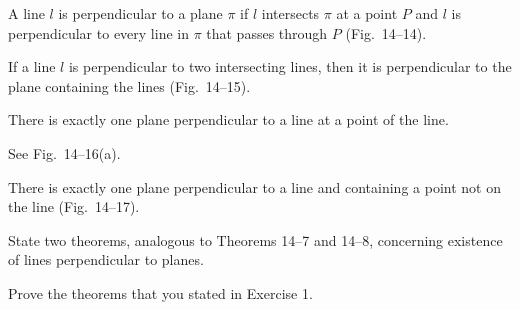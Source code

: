 \documentclass[11pt]{book}
\theoremstyle{bkplain}
\theoremstyle{XIplainnote}
\theoremstyle{bkplain}
\theoremstyle{bkplain}
\begin{document}
\FIGXIVTHIRTEENFOURTEEN

\begin{definition}
A line $l$ is perpendicular to a plane $\pi$ if $l$ intersects $\pi$ at a point
$P$ and $l$ is perpendicular to every line in $\pi$ that passes through $P$
(Fig.~14--14).
\end{definition}

\begin{theorem}
If a line $l$ is perpendicular to two intersecting lines, then it is
perpendicular to the plane containing the lines (Fig.~14--15).
\end{theorem}


\FIGXIVFIFTEENSIXTEEN

\begin{theorem}
There is exactly one plane perpendicular to a line at a point of the line.
\end{theorem}

\noindent See Fig.~14--16(a).

\noindent[\emph{Hint:} Use the previous theorem to show that there is at least
one plane. To prove there is only one, it is sufficient to show that if $l_1$,
$l_2$, and $l_3$ in Fig.~14--16(b) are distinct lines perpendicular to $l$ at
$P$, then they are in a single plane. Thus, the plane of $l_2$ and $l_3$ meets
the plane of $l$ and $l_1$ in a line $l' \perp l$. Since there is only one line
in the plane of $l$ and $l_1$ perpendicular to $l$ at $P$, we have $l_1 = l'$.
Hence $l_1$, $l_2$, and $l_3$ are coplanar.]

\begin{theorem}
There is exactly one plane perpendicular to a line and containing a point not on
the line (Fig.~14--17).
\end{theorem}

\begin{exercisecols}
\begin{exlist}
\item State two theorems, analogous to Theorems 14--7 and 14--8, concerning
      existence of lines perpendicular to planes.
\item Prove the theorems that you stated in Exercise 1.
\end{exlist}
\end{exercisecols}
\end{document}
